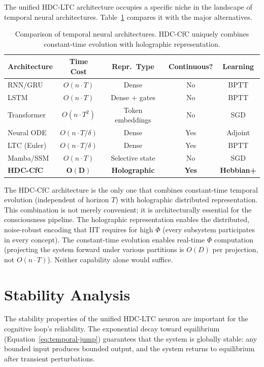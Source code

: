 \documentclass[12pt]{book}
\begin{document}
The unified HDC-LTC architecture occupies a specific niche in the landscape of temporal neural architectures. Table~\ref{tab:temporal-architectures} compares it with the major alternatives.

\begin{table}[H]
\centering
\caption{Comparison of temporal neural architectures. HDC-CfC uniquely combines constant-time evolution with holographic representation.}
\label{tab:temporal-architectures}
\begin{tabular}{lcccc}
\toprule
\textbf{Architecture} & \textbf{Time Cost} & \textbf{Repr.\ Type} & \textbf{Continuous?} & \textbf{Learning} \\
\midrule
RNN/GRU & $O(n \cdot T)$ & Dense & No & BPTT \\
LSTM & $O(n \cdot T)$ & Dense + gates & No & BPTT \\
Transformer & $O(n \cdot T^2)$ & Token embeddings & No & SGD \\
Neural ODE & $O(n \cdot T/\delta)$ & Dense & Yes & Adjoint \\
LTC (Euler) & $O(n \cdot T/\delta)$ & Dense & Yes & BPTT \\
Mamba/SSM & $O(n \cdot T)$ & Selective state & No & SGD \\
\textbf{HDC-CfC} & $\mathbf{O(D)}$ & \textbf{Holographic} & \textbf{Yes} & \textbf{Hebbian+} \\
\bottomrule
\end{tabular}
\end{table}

The HDC-CfC architecture is the only one that combines constant-time temporal evolution (independent of horizon $T$) with holographic distributed representation. This combination is not merely convenient; it is architecturally essential for the consciousness pipeline. The holographic representation enables the distributed, noise-robust encoding that IIT requires for high $\Phi$ (every subsystem participates in every concept). The constant-time evolution enables real-time $\Phi$ computation (projecting the system forward under various partitions is $O(D)$ per projection, not $O(n \cdot T)$). Neither capability alone would suffice.

\section{Stability Analysis}

The stability properties of the unified HDC-LTC neuron are important for the cognitive loop's reliability. The exponential decay toward equilibrium (Equation~\ref{eq:temporal-jump}) guarantees that the system is globally stable: any bounded input produces bounded output, and the system returns to equilibrium after transient perturbations.
\end{document}
